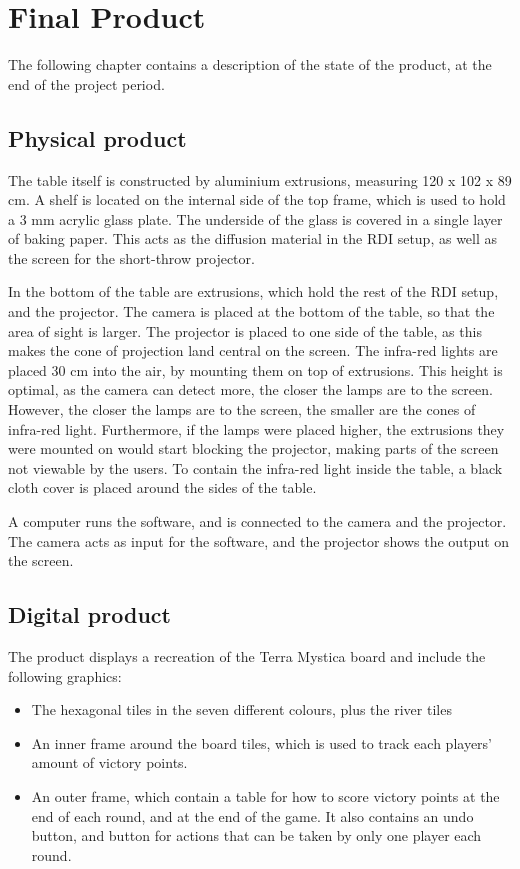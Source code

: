 \chapter{Final Product}\label{ch:finproduct}
The following chapter contains a description of the state of the product, at the end of the project period.

\section{Physical product}
The table itself is constructed by aluminium extrusions, measuring 120 x 102 x 89 cm. A shelf is located on the internal side of the top frame, which is used to hold a 3 mm acrylic glass plate. The underside of the glass is covered in a single layer of baking paper. This acts as the diffusion material in the RDI setup, as well as the screen for the short-throw projector.

In the bottom of the table are extrusions, which hold the rest of the RDI setup, and the projector. The camera is placed at the bottom of the table, so that the area of sight is larger. The projector is placed to one side of the table, as this makes the cone of projection land central on the screen. The infra-red lights are placed 30 cm into the air, by mounting them on top of extrusions. This height is optimal, as the camera can detect more, the closer the lamps are to the screen. However, the closer the lamps are to the screen, the smaller are the cones of infra-red light.  Furthermore, if the lamps were placed higher, the extrusions they were mounted on would start blocking the projector, making parts of the screen not viewable by the users. To contain the infra-red light inside the table, a black cloth cover is placed around the sides of the table.

A computer runs the software, and is connected to the camera and the projector. The camera acts as input for the software, and the projector shows the output on the screen.

\section{Digital product}
The product displays a recreation of the Terra Mystica board and include the following graphics:
\begin{itemize}
	\item The hexagonal tiles in the seven different colours, plus the river tiles
	\item An inner frame around the board tiles, which is used to track each players' amount of victory points.
	\item An outer frame, which contain a table for how to score victory points at the end of each round, and at the end of the game. It also contains an undo button, and button for actions that can be taken by only one player each round.
\end{itemize}

